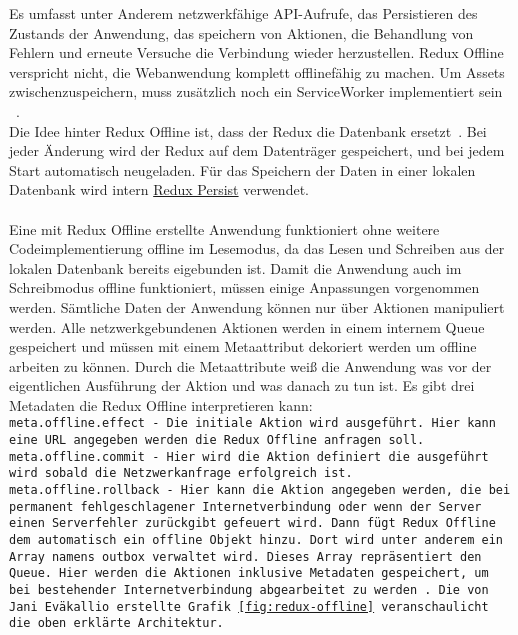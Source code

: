 Es umfasst unter Anderem netzwerkfähige \gls{API}-Aufrufe, das Persistieren des Zustands der Anwendung, das speichern von Aktionen, die Behandlung von Fehlern und erneute Versuche die Verbindung wieder herzustellen.
Redux Offline verspricht nicht, die Webanwendung komplett offlinefähig zu machen. Um \gls{Assets} zwischenzuspeichern, muss zusätzlich noch ein ServiceWorker implementiert sein ~\cite{redux-offline-gh}.\\
Die Idee hinter Redux Offline ist, dass der Redux  die Datenbank ersetzt~\cite{redux-offline}. Bei jeder Änderung wird der Redux  auf dem Datenträger gespeichert, und bei jedem Start automatisch neugeladen. Für das Speichern der Daten in einer lokalen Datenbank wird intern \hyperref[sub:reduxpersist]{Redux Persist} verwendet.\\\\
Eine mit Redux Offline erstellte Anwendung funktioniert ohne weitere Codeimplementierung offline im Lesemodus, da das Lesen und Schreiben aus der lokalen Datenbank bereits eigebunden ist.
Damit die Anwendung auch im Schreibmodus offline funktioniert, müssen einige Anpassungen vorgenommen werden.
Sämtliche Daten der Anwendung können nur über Aktionen manipuliert werden. 
Alle netzwerkgebundenen Aktionen werden  in einem internem \gls{Queue} gespeichert und müssen mit einem Metaattribut dekoriert werden um offline arbeiten zu können. Durch die Metaattribute weiß die Anwendung was vor der eigentlichen Ausführung der Aktion und was danach zu tun ist. 
Es gibt drei Metadaten die Redux Offline interpretieren kann:\\
\tt{meta.offline.effect} - Die initiale Aktion wird ausgeführt. Hier kann eine URL angegeben werden die Redux Offline anfragen soll.\\
\tt{meta.offline.commit} - Hier wird die Aktion definiert die ausgeführt wird sobald die Netzwerkanfrage erfolgreich ist.\\
\tt{meta.offline.rollback} - Hier kann die Aktion angegeben werden, die bei  permanent fehlgeschlagener Internetverbindung oder wenn der Server einen Serverfehler zurückgibt gefeuert wird.
Dann fügt Redux Offline dem  automatisch ein \tt{offline} Objekt hinzu. Dort wird unter anderem ein Array namens \tt{outbox} verwaltet wird.
Dieses Array repräsentiert den \gls{Queue}. Hier werden die Aktionen inklusive Metadaten gespeichert, um bei bestehender Internetverbindung abgearbeitet zu werden~\cite{redux-offline-docs}.
Die von Jani Eväkallio erstellte Grafik \ref{fig:redux-offline} veranschaulicht die oben erklärte Architektur.\\
